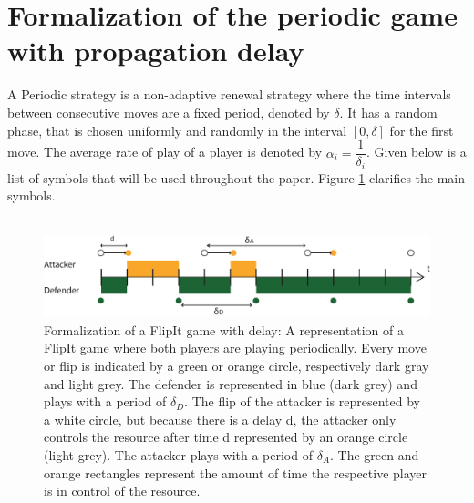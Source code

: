 \section{Formalization of the periodic game with propagation delay}
\label{ch2:periodicvirus}

 A Periodic strategy is a non-adaptive renewal strategy where the time intervals between consecutive moves are a fixed period, denoted by $\delta$. It has a random phase, that is chosen uniformly and randomly in the interval $[0,\delta]$ for the first move. The average rate of play of a player is denoted by $\alpha_{i} = \dfrac{1}{\delta_{i}}$. Given below is a list of symbols that will be used throughout the paper. Figure \ref{FlipItDelay} clarifies the main symbols.\\
~~\\

\begin{figure}[hbtp]
\centering
\includegraphics[scale=0.7]{Images/DefFlip.pdf}
\caption{Formalization of a FlipIt game with delay: A representation of a FlipIt game where both players are playing periodically. Every move or flip is indicated by a green or orange circle, respectively dark gray and light grey.  The defender is represented in blue (dark grey) and plays with a period of $\delta_{D}$. The flip of the attacker is represented by a white circle, but because there is a delay d, the attacker only controls the resource after time d represented by an orange circle (light grey). The attacker plays with a period of $\delta_{A}$. The green and orange rectangles represent the amount of time the respective player is in control of the resource.}
\label{FlipItDelay}
\end{figure}

